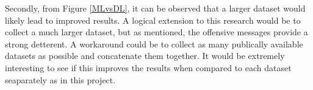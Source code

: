 \documentclass[12pt,a4paper]{article}
\begin{document}
Secondly, from Figure \ref{MLvsDL}, it can be observed that a larger dataset would likely lead to improved results. A logical extension to this research would be to collect a much larger dataset, but as mentioned, the offensive messages provide a strong detterent. A workaround could be to collect as many publically available datasets as possible and concatenate them together. It would be extremely interesting to see if this improves the results when compared to each dataset seaparately as in this project.











 
\end{document}
